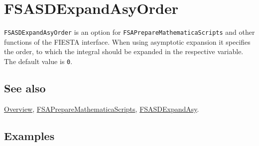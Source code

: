 \documentclass[../FeynHelpersManual.tex]{subfiles}
\begin{document}
\hypertarget{fsasdexpandasyorder}{
\section{FSASDExpandAsyOrder}\label{fsasdexpandasyorder}}

\texttt{FSASDExpandAsyOrder} is an option for
\texttt{FSAPrepareMathematicaScripts} and other functions of the FIESTA
interface. When using asymptotic expansion it specifies the order, to
which the integral should be expanded in the respective variable. The
default value is \texttt{0}.

\subsection{See also}

\hyperlink{toc}{Overview},
\hyperlink{fsapreparemathematicascripts}{FSAPrepareMathematicaScripts},
\hyperlink{fsasdexpandasy}{FSASDExpandAsy}.

\subsection{Examples}
\end{document}
